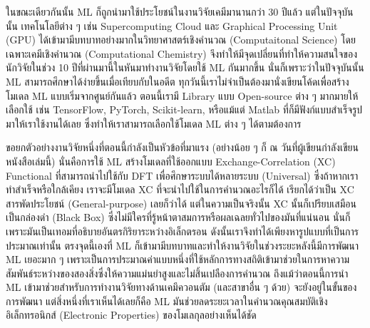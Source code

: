 ในขณะเดียวกันนั้น ML ก็ถูกนำมาใช้ประโยชน์ในงานวิจัยเคมีมานานกว่า 30 ปีแล้ว แต่ในปัจจุบันนั้น เทคโนโลยีต่าง ๆ เช่น Supercomputing Cloud และ 
Graphical Processing Unit (GPU) ได้เข้ามามีบทบาทอย่างมากในวิทยาศาสตร์เชิงคำนวณ (Computaitonal Science) โดยเฉพาะเคมีเชิงคำนวณ 
(Computational Chemistry) จึงทำให้มีจุดเปลี่ยนที่ทำให้ความสนใจของนักวิจัยในช่วง 10 ปีที่ผ่านมานี้ในหันมาทำงานวิจัยโดยใช้ ML กันมากขึ้น 
นั่นก็เพราะว่าในปัจจุบันนั้น ML สามารถศึกษาได้ง่ายขึ้นเมื่อเทียบกับในอดีต ทุกวันนี้เราไม่จำเป็นต้องมานั่งเขียนโค้ดเพื่อสร้างโมเดล ML แบบเริ่มจากศูนย์กันแล้ว 
ตอนนี้เรามี Library แบบ Open-source ต่าง ๆ มากมายให้เลือกใช้ เช่น TensorFlow, PyTorch, Scikit-learn, หรือแม้แต่ Matlab 
ที่ก็มีฟังก์แบบสำเร็จรูปมาให้เราใช้งานได้เลย ซึ่งทำให้เราสามารถเลือกใช้โมเดล ML ต่าง ๆ ได้ตามต้องการ

ขอยกตัวอย่างงานวิจัยหนึ่งที่ตอนนี้กำลังเป็นหัวข้อที่มาแรง (อย่างน้อย ๆ ก็ ณ วันที่ผู้เขียนกำลังเขียนหนังสือเล่มนี้) นั่นคือการใช้ ML สร้างโมเดลที่ใช้ออกแบบ 
Exchange-Correlation (XC) Functional ที่สามารถนำไปใช้กับ DFT เพื่อศึกษาระบบได้หลายระบบ (Universal) ซึ่งถ้าหากเราทำสำเร็จหรือใกล้เคียง 
เราจะมีโมเดล XC ที่จะนำไปใช้ในการคำนวณอะไรก็ได้ เรียกได้ว่าเป็น XC สารพัดประโยชน์ (General-purpose) เลยก็ว่าได้ แต่ในความเป็นจริงนั้น 
XC นั้นก็เปรียบเสมือนเป็นกล่องดำ (Black Box) ซึ่งไม่มีใครที่รู้หน้าตาสมการหรือผลเฉลยทั่วไปของมันที่แน่นอน นั่นก็เพราะมันเป็นเทอมที่อธิบายอันตรกิริยาระหว่างอิเล็กตรอน 
ดังนั้นเราจึงทำได้เพียงหารูปแบบที่เป็นการประมาณเท่านั้น ตรงจุดนี้เองที่ ML ก็เข้ามามีบทบาทและทำให้งานวิจัยในช่วงระยะหลังนี้มีการพัฒนา ML เยอะมาก ๆ 
เพราะเป็นการประมาณค่าแบบหนึ่งที่ใช้หลักการทางสถิติเข้ามาช่วยในการหาความสัมพันธ์ระหว่างของสองสิ่งซึ่งให้ความแม่นยำสูงและไม่สิ้นเปลืองการคำนวณ 
ถึงแม้ว่าตอนนี้การนำ ML เข้ามาช่วยสำหรับการทำงานวิจัยทางด้านเคมึควอนตัม (และสาขาอื่น ๆ ด้วย) จะยังอยู่ในขั้นของการพัฒนา แต่สิ่งหนึ่งที่เราเห็นได้เลยก็คือ 
ML มันช่วยลดระยะเวลาในคำนวณคุณสมบัติเชิงอิเล็กทรอนิกส์ (Electronic Properties) ของโมเลกุลอย่างเห็นได้ชัด

